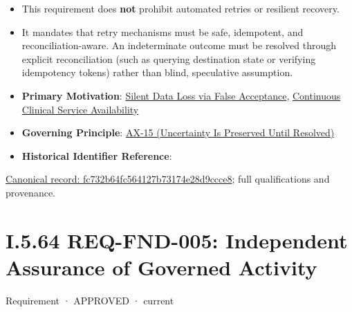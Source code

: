 \begin{itemize}


\item This requirement does \textbf{not} prohibit automated retries or resilient recovery.

\item 

It mandates that retry mechanisms must be safe, idempotent, and reconciliation-aware. An indeterminate outcome must be resolved through explicit reconciliation (such as querying destination state or verifying idempotency tokens) rather than blind, speculative assumption.




\item 

\textbf{Primary Motivation}: \href{\detokenize{../../../../../../../../../docs/markdown/01-motivation/drivers-assessments/assessments.md}}{Silent Data Loss via False Acceptance}, \href{\detokenize{../../../../../../../../../docs/markdown/01-motivation/drivers-assessments/drivers.md}}{Continuous Clinical Service Availability}




\item \textbf{Governing Principle}: \hyperref[element:ef8abbaec37e4890ad78b9f263e67906]{AX-15 (Uncertainty Is Preserved Until Resolved)}

\item \textbf{Historical Identifier Reference}: \texttt{}

\end{itemize}

{\footnotesize \href{../../../../../../../../continuum/motivation/requirement/fc732b64fc564127b73174e28d9ccce8.md}{Canonical record: fc732b64fc564127b73174e28d9ccce8}; full qualifications and provenance.}\par
\section*{I.5.64 REQ-FND-005: Independent Assurance of Governed Activity}
\label{navigation:I.5.64}

\label{element:bbb7438e78604308abba93afc14f4e2e}
{\small Requirement · APPROVED · current}\par

